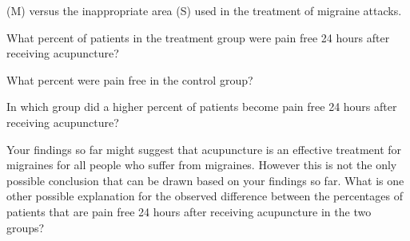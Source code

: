 {\begin{minipage}[c]{0.25\textwidth}
{(M) versus the inappropriate area (S) used in the treatment of migraine attacks.}
\end{minipage}
\begin{parts}
\item What percent of patients in the treatment group were pain free 24 hours 
after receiving acupuncture? 
\item What percent were pain free in the control group?
\item In which group did a higher percent of patients become pain free 24 hours 
after receiving acupuncture?
\item Your findings so far might suggest that acupuncture is an effective treatment 
for migraines for all people who suffer from migraines. However this is not the 
only possible conclusion that can be drawn based on your findings so far. What is 
one other possible explanation for the observed difference between the percentages 
of patients that are pain free 24 hours after receiving acupuncture in the two groups?
\end{parts}
}{}


